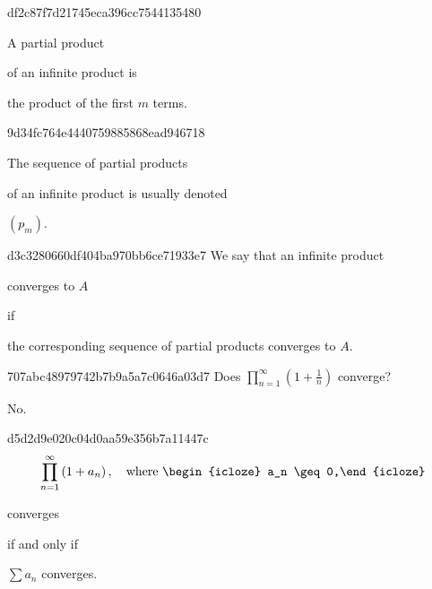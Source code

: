 \begin{note}{df2c87f7d21745eca396cc7544135480}
    \begin{icloze}{2}A partial product\end{icloze} of an infinite product is
    \begin{icloze}{1}
        the product of the first \({ m }\) terms.
    \end{icloze}
\end{note}

\begin{note}{9d34fc764e4440759885868ead946718}
    \begin{icloze}{2}The sequence of partial products\end{icloze} of an infinite product is usually denoted \begin{icloze}{1}\({ (p_m) }\).\end{icloze}
\end{note}

\begin{note}{d3c3280660df404ba970bb6ce71933e7}
    We say that an infinite product \begin{icloze}{2}converges to \({ A }\)\end{icloze} if \begin{icloze}{1}the corresponding sequence of partial products converges to \({ A }\).\end{icloze}
\end{note}

\begin{note}{707abc48979742b7b9a5a7c0646a03d7}
    Does \({ \displaystyle \prod_{n = 1}^{\infty} \left( 1 + \frac{1}{n} \right) }\) converge?

    \begin{cloze}{1}
        No.
    \end{cloze}
\end{note}

\begin{note}{d5d2d9e020c04d0aa59e356b7a11447c}
    \[
        \prod_{n = 1}^{\infty} \left( 1 + a_n \right), \quad \text{where } \begin{icloze}{2}a_n \geq 0,\end{icloze}
    \]
    \begin{icloze}{3}converges\end{icloze} if and only if \begin{icloze}{1}\({ \sum a_n }\) converges.\end{icloze}
\end{note}

